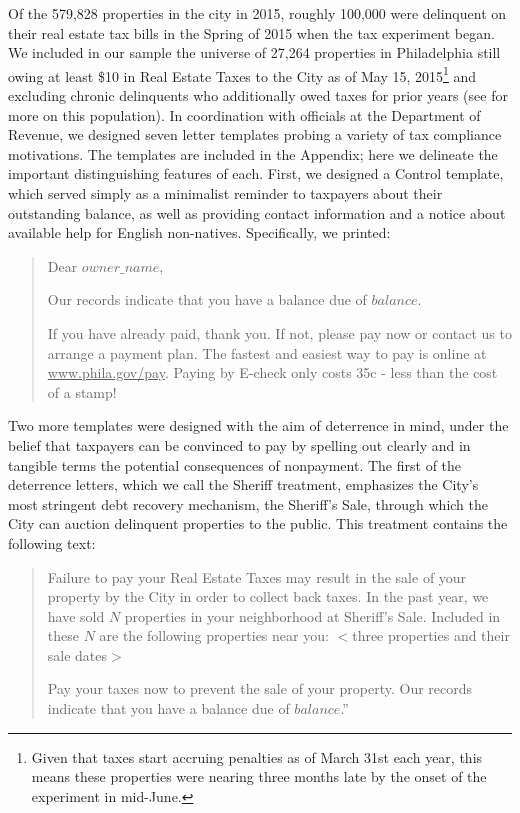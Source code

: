 \documentclass[12pt,titlepage]{article}
\begin{document}
Of the 579,828 properties in the city in 2015, roughly 100,000 were
delinquent on their real estate tax bills in the Spring of 2015 when
the tax experiment began. We included in our sample the universe of 27,264
properties in Philadelphia still owing at least \$10 in Real Estate
Taxes to the City as of May 15, 2015\footnote{
	Given that taxes start accruing penalties as of 
	March 31st each year, this means these properties were 
	nearing three months late by the onset of the 
	experiment in mid-June.}
and excluding chronic delinquents who additionally owed taxes for 
prior years (see \citep*{chirico} for more on this population). 
In coordination with officials at the Department of Revenue, we designed 
seven letter templates probing a variety of tax compliance motivations. 
The templates are included in the Appendix; here we delineate the important 
distinguishing features of each. First, we designed a 
\hypertarget{control}{Control} template, which served simply as a minimalist 
reminder to taxpayers about their outstanding balance, as well as 
providing contact information and a notice about 
available help for English non-natives. Specifically, we printed:

\blockquote{
	Dear $owner\_name$,

	Our records indicate that you have a balance due of $balance$.

	If you have already paid, thank you. If not, please pay now or contact us
	to arrange a payment plan. The fastest and easiest way to pay is online at
	\underline{www.phila.gov/pay}. Paying by E-check only costs 35c - 
	less than the cost of a stamp!
}

Two more templates were designed with the aim of deterrence in mind, under 
the belief that taxpayers can be convinced to pay by spelling out clearly 
and in tangible terms the potential consequences of nonpayment. The first 
of the deterrence letters, which we call the \hypertarget{sheriff}{Sheriff}
treatment, emphasizes the City's most stringent debt recovery mechanism, 
the Sheriff's Sale, through which the City can auction delinquent properties 
to the public. This treatment contains the following text: 

\blockquote{
	Failure to pay your Real Estate Taxes may result in the sale of 
	your property by the City in order to collect back taxes. In the 
	past year, we have sold $N$ properties in your neighborhood at 
	Sheriff's Sale.	Included in these $N$ are the following properties 
	near you: $<$three properties and their sale dates$>$ 

	Pay your taxes now to prevent the sale of your property. 
	Our records indicate that you have a balance due of $balance$.”
}
\end{document}
